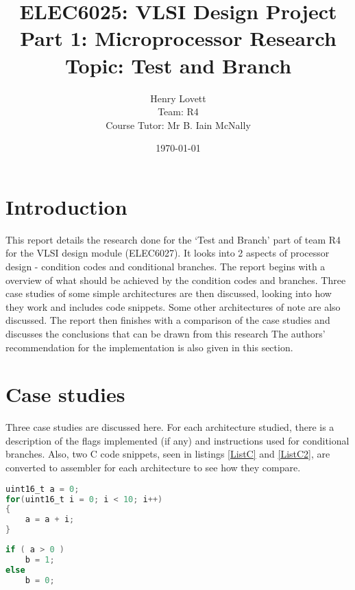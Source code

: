 \documentclass[12pt,a4paper]{article}
\title{ELEC6025: VLSI Design Project \\Part 1: Microprocessor Research\\Topic: Test and Branch}
\author{Henry Lovett\\ Team: R4\\Course Tutor: Mr B. Iain McNally}
\date{\today}
\begin{document}
\begin{titlepage}
\maketitle
\end{titlepage}

\tableofcontents
\clearpage
\begin{bibunit}[is-unsrt]
\section{Introduction}

This report details the research done for the `Test and Branch' part of team R4 for the VLSI design module (ELEC6027).
It looks into 2 aspects of processor design - condition codes and conditional branches. 
The report begins with a overview of what should be achieved by the condition codes and branches. 
Three case studies of some simple architectures are then discussed, looking into how they work and includes code snippets. 
Some other architectures of note are also discussed.
The report then finishes with a comparison of the case studies and discusses the conclusions that can be drawn from this research
The authors' recommendation for the implementation is also given in this section.



\section{Case studies}

Three case studies are discussed here. 
For each architecture studied, there is a description of the flags implemented (if any) and instructions used for conditional branches. 
Also, two C code snippets, seen in listings \ref{ListC} and \ref{ListC2}, are converted to assembler for each architecture to see how they compare.
\begin{lstlisting}[frame=single,caption=C Code,language=C,label=ListC]
uint16_t a = 0;
for(uint16_t i = 0; i < 10; i++)
{
	a = a + i;
}
\end{lstlisting}
\begin{lstlisting}[frame=single,caption=C Code,language=C,label=ListC2]
if ( a > 0 )
	b = 1;
else
	b = 0;
\end{lstlisting}

\end{bibunit}
\end{document}
